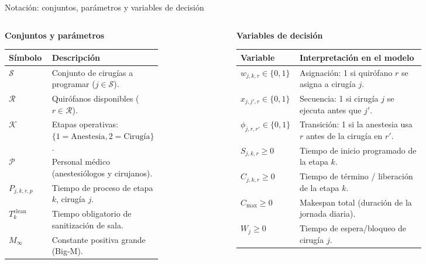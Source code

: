 \documentclass[aspectratio=169,11pt]{beamer}
\begin{document}
\begin{frame}{Notación: conjuntos, parámetros y variables de decisión}
  \begin{columns}[t]
    \begin{column}{0.48\textwidth}
      \textbf{\color{primary}Conjuntos y parámetros}
      \scriptsize
      \begin{table}
        \centering
        \begin{tabular}{lp{0.70\linewidth}}
          \toprule
          \textbf{Símbolo} & \textbf{Descripción} \\
          \midrule
          $\mathcal{S}$ & Conjunto de cirugías a programar ($j \in \mathcal{S}$). \\
          $\mathcal{R}$ & Quirófanos disponibles ($r \in \mathcal{R}$). \\
          $\mathcal{K}$ & Etapas operativas: $\{1=\text{Anestesia}, 2=\text{Cirugía}\}$. \\
          $\mathcal{P}$ & Personal médico (anestesiólogos y cirujanos). \\
          $P_{j,k,r,p}$ & Tiempo de proceso de etapa $k$, cirugía $j$. \\
          $T^{\text{clean}}_k$ & Tiempo obligatorio de sanitización de sala. \\
          $M_{\infty}$ & Constante positiva grande (Big-M). \\
          \bottomrule
        \end{tabular}
      \end{table}
    \end{column}

    \begin{column}{0.52\textwidth}
      \textbf{\color{primary}Variables de decisión}
      \scriptsize
      \begin{table}
        \centering
        \begin{tabular}{lp{0.68\linewidth}}
          \toprule
          \textbf{Variable} & \textbf{Interpretación en el modelo} \\
          \midrule
          $w_{j,k,r} \in \{0,1\}$ & Asignación: 1 si quirófano $r$ se asigna a cirugía $j$. \\
          $x_{j,j',r} \in \{0,1\}$ & Secuencia: 1 si cirugía $j$ se ejecuta antes que $j'$. \\
          $\phi_{j,r,r'} \in \{0,1\}$ & Transición: 1 si la anestesia usa $r$ antes de la cirugía en $r'$. \\
          $S_{j,k,r} \ge 0$ & Tiempo de inicio programado de la etapa $k$. \\
          $C_{j,k,r} \ge 0$ & Tiempo de término / liberación de la etapa $k$. \\
          $C_{\max} \ge 0$ & Makespan total (duración de la jornada diaria). \\
          $W_j \ge 0$ & Tiempo de espera/bloqueo de cirugía $j$. \\
          \bottomrule
        \end{tabular}
      \end{table}
    \end{column}
  \end{columns}
\end{frame}
\end{document}
